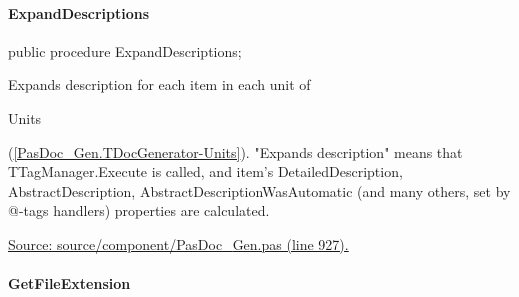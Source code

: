 \documentclass{report}
\newif\ifpdf
\begin{document}
\paragraph*{ExpandDescriptions}\hspace*{\fill}

\label{PasDoc_Gen.TDocGenerator-ExpandDescriptions}
\begin{list}{}{
\setlength{\itemindent}{0cm}
\setlength{\listparindent}{0cm}
\setlength{\leftmargin}{\evensidemargin}
\addtolength{\leftmargin}{\tmplength}
\settowidth{\labelsep}{X}
\addtolength{\leftmargin}{\labelsep}
\setlength{\labelwidth}{\tmplength}
}
\item[\textbf{Declaration}\hfill]
\ifpdf
\begin{flushleft}
\fi
\begin{ttfamily}
public procedure ExpandDescriptions;\end{ttfamily}

\ifpdf
\end{flushleft}
\fi

\par
\item[\textbf{Description}]
Expands description for each item in each unit of \begin{ttfamily}Units\end{ttfamily}(\ref{PasDoc_Gen.TDocGenerator-Units}). "Expands description" means that TTagManager.Execute is called, and item's DetailedDescription, AbstractDescription, AbstractDescriptionWasAutomatic (and many others, set by @{-}tags handlers) properties are calculated.\par
\href{https://github.com/pasdoc/pasdoc/blob/master/source/component/PasDoc_Gen.pas#L927}{Source: source/component/PasDoc{\_}Gen.pas (line 927).}

\end{list}
\paragraph*{GetFileExtension}\hspace*{\fill}
\end{document}
